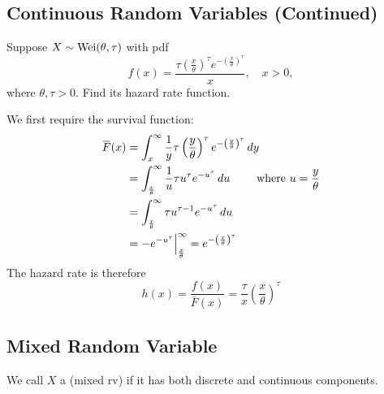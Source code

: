 \documentclass[notoc,notitlepage]{tufte-book}
\begin{document}
\subsection{Continuous Random Variables (Continued)}%
\label{sub:continuous_random_variables_continued}

\begin{eg}
  Suppose $X \sim \operatorname{Wei}(\theta, \tau)$ with pdf
  \begin{equation*}
    f(x) = \frac{\tau \left( \frac{x}{\theta} \right)^\tau e^{-\left( \frac{x}{\theta} \right)^\tau}}{x}, \quad x > 0,
  \end{equation*}
  where $\theta, \tau > 0$. Find its hazard rate function.
\end{eg}

\begin{solution}
  We first require the survival function:
  \begin{align*}
    \bar{F}(x) &= \int_{x}^{\infty} \frac{1}{y} \tau \left( \frac{y}{\theta} \right)^\tau e^{-\left( \frac{y}{\theta} \right)^\tau} \dif{y} \\
               &= \int_{\frac{x}{\theta}}^{\infty} \frac{1}{u} \tau u^\tau e^{-u^\tau} \dif{u} \qquad \text{ where } u = \frac{y}{\theta} \\
               &= \int_{\frac{x}{\theta}}^{\infty} \tau u^{\tau - 1} e^{-u^\tau} \dif{u} \\
               &= -e^{-u^\tau} \at{\frac{x}{\theta}}{\infty} = e^{-\left( \frac{x}{\theta} \right)^\tau}
  \end{align*}
  The hazard rate is therefore
  \begin{equation*}
    h(x) = \frac{f(x)}{\bar{F}(x)} = \frac{\tau}{x} \left( \frac{x}{\theta} \right)^\tau
  \end{equation*}
\end{solution}


\subsection{Mixed Random Variable}%
\label{sub:mixed_random_variable}

\begin{defn}
\label{defn:mixed_random_variable}
  We call $X$ a  (mixed rv) if it has both discrete and continuous components.
\end{defn}
\end{document}
